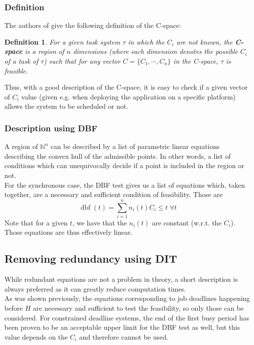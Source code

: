 \documentclass[times, 10pt,twocolumn, a4paper]{article}
\newtheorem{definition}{Definition}
\newcommand{\dbf}[1]{\operatorname{dbf}(#1)}
\begin{document}
    \subsubsection{Definition}

The authors of \cite{george2009characterization} give the following definition of the C-space:
\begin{definition}
For a given task system $\tau$ in which the $C_i$ are not known, the \textbf{C-space} is a region of $n$ dimensions (where each dimension denotes the possible $C_i$ of a task of $\tau$) such that for any vector $C = \{ C_1, \cdots, C_n\}$ in the C-space, $\tau$ is feasible.
\end{definition}

Thus, with a good description of the C-space, it is easy to check if a given vector of $C_i$ value (given e.g. when deploying the application on a specific platform) allows the system to be scheduled or not.

  \subsubsection{Description using DBF}

A region of $\mathbb{N}^n$ can be described by a list of parametric linear equations describing the convex hull of the admissible points. In other words, a list of conditions which can unequivocally decide if a point is included in the region or not.\\

For the synchronous case, the DBF test gives us a list of equations which, taken together, are a necessary and sufficient condition of feasibility. Those are
$$\dbf{t} = \sum_{i=1}^{n} n_i(t) C_i \leq t \; \forall t$$
Note that for a given $t$, we have that the $n_i(t)$ are constant (w.r.t. the $C_i$). Those equations are thus effectively linear.\\

\subsection{Removing redundancy using DIT}

While redundant equations are not a problem in theory, a short description is always preferred as it can greatly reduce computation times.\\

As was shown previously, the equations corresponding to job deadlines happening before $H$ are necessary and sufficient to test the feasibility, so only those can be considered. For constrained deadline systems, the end of the first busy period has been proven to be an acceptable upper limit for the DBF test as well, but this value depends on the $C_i$ and therefore cannot be used.
\end{document}
